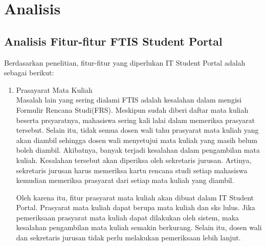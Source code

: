 \chapter{Analisis}
\label{chap:analisis}

\section{Analisis Fitur-fitur FTIS Student Portal}
\label{sec:fitur}

Berdasarkan penelitian, fitur-fitur yang diperlukan IT Student Portal adalah sebagai berikut:

\begin{enumerate}

\item Prasayarat Mata Kuliah \\
Masalah lain yang sering dialami FTIS adalah kesalahan dalam mengisi Formulir Rencana Studi(FRS). Meskipun sudah diberi daftar mata kuliah beserta prsyaratnya, mahasiswa sering kali lalai dalam memeriksa prasyarat tersebut. Selain itu, tidak semua dosen wali tahu prasyarat mata kuliah yang akan diambil sehingga dosen wali menyetujui mata kuliah yang masih belum boleh diambil. Akibatnya, banyak terjadi kesalahan dalam pengambilan mata kuliah. Kesalahan tersebut akan diperiksa oleh sekretaris jurusan. Artinya, sekretaris jurusan harus memeriksa kartu rencana studi setiap mahasiswa kemudian memeriksa prasyarat dari setiap mata kuliah yang diambil. 

Oleh karena itu, fitur prasyarat mata kuliah akan dibuat dalam IT Student Portal.  Prasyarat mata kuliah dapat berupa mata kuliah dan sks lulus. Jika pemeriksaan prasyarat mata kuliah dapat dilakukan oleh sistem, maka kesalahan pengambilan mata kuliah semakin berkurang. Selain itu, dosen wali dan sekretaris jurusan tidak perlu melakukan pemeriksaan lebih lanjut. 

\end{enumerate}